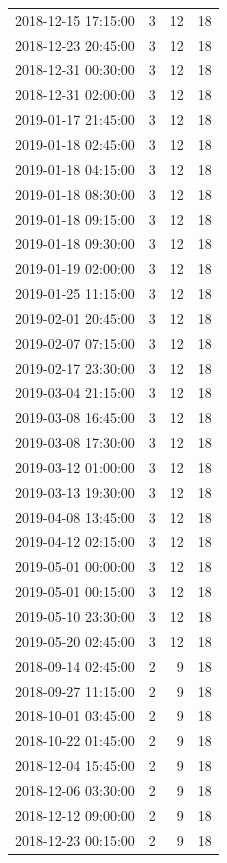 \begin{tabular}{lrrr}
2018-12-15 17:15:00 & 3 & 12 & 18 \\
2018-12-23 20:45:00 & 3 & 12 & 18 \\
2018-12-31 00:30:00 & 3 & 12 & 18 \\
2018-12-31 02:00:00 & 3 & 12 & 18 \\
2019-01-17 21:45:00 & 3 & 12 & 18 \\
2019-01-18 02:45:00 & 3 & 12 & 18 \\
2019-01-18 04:15:00 & 3 & 12 & 18 \\
2019-01-18 08:30:00 & 3 & 12 & 18 \\
2019-01-18 09:15:00 & 3 & 12 & 18 \\
2019-01-18 09:30:00 & 3 & 12 & 18 \\
2019-01-19 02:00:00 & 3 & 12 & 18 \\
2019-01-25 11:15:00 & 3 & 12 & 18 \\
2019-02-01 20:45:00 & 3 & 12 & 18 \\
2019-02-07 07:15:00 & 3 & 12 & 18 \\
2019-02-17 23:30:00 & 3 & 12 & 18 \\
2019-03-04 21:15:00 & 3 & 12 & 18 \\
2019-03-08 16:45:00 & 3 & 12 & 18 \\
2019-03-08 17:30:00 & 3 & 12 & 18 \\
2019-03-12 01:00:00 & 3 & 12 & 18 \\
2019-03-13 19:30:00 & 3 & 12 & 18 \\
2019-04-08 13:45:00 & 3 & 12 & 18 \\
2019-04-12 02:15:00 & 3 & 12 & 18 \\
2019-05-01 00:00:00 & 3 & 12 & 18 \\
2019-05-01 00:15:00 & 3 & 12 & 18 \\
2019-05-10 23:30:00 & 3 & 12 & 18 \\
2019-05-20 02:45:00 & 3 & 12 & 18 \\
2018-09-14 02:45:00 & 2 & 9 & 18 \\
2018-09-27 11:15:00 & 2 & 9 & 18 \\
2018-10-01 03:45:00 & 2 & 9 & 18 \\
2018-10-22 01:45:00 & 2 & 9 & 18 \\
2018-12-04 15:45:00 & 2 & 9 & 18 \\
2018-12-06 03:30:00 & 2 & 9 & 18 \\
2018-12-12 09:00:00 & 2 & 9 & 18 \\
2018-12-23 00:15:00 & 2 & 9 & 18 \\

\end{tabular}
